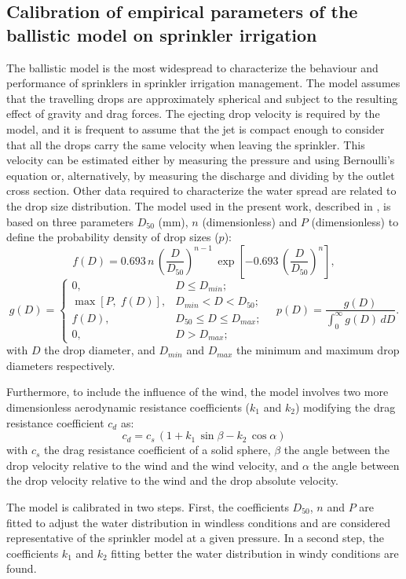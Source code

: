 \documentclass[review,authoryear]{elsarticle}
\newcommand{\EQ}[2]
{\begin{equation}#1\label{#2}\end{equation}}
\newcommand{\C}[1]{\left[#1\right]}
\newcommand{\PA}[1]{\left(#1\right)}
\begin{document}
\subsection{Calibration of empirical parameters of the ballistic model on
sprinkler irrigation}

The ballistic model \citep{Fukui80,Playan06} is the most widespread to characterize the behaviour and performance of sprinklers in sprinkler irrigation management. The model assumes that the travelling drops are approximately spherical and subject to the resulting effect of gravity and drag forces. The ejecting drop velocity is required by the model, and it is frequent to assume that the jet is compact enough to consider that all the drops carry the same velocity when leaving the sprinkler. This velocity can be estimated either by measuring the pressure and using Bernoulli's equation or, alternatively, by measuring the discharge and dividing by the outlet cross section. Other data required to characterize the water spread are related to the drop size distribution. The model used in the present work, described in \cite{Ouazaa14}, is based on three parameters $D_{50}$ (mm), $n$ (dimensionless) and $P$ (dimensionless) to define the probability density of drop sizes ($p$):
\[
	f(D)=0.693\,n\,\PA{\frac{D}{D_{50}}}^{n-1}
	\,\exp\C{-0.693\,\PA{\frac{D}{D_{50}}}^n},
\]
\EQ
{
	g(D)=\left\{\begin{array}{lc}0,&D\leq D_{min};\\
	\max[P,\;f(D)],&D_{min}<D<D_{50};\\f(D),&D_{50}\leq D\leq D_{max};\\
	0,&D>D_{max};\end{array}\right.\quad
	p(D)=\frac{g(D)}{\int_0^\infty g(D)\,dD}.
}{EqSprinklerDropSizes}
with $D$ the drop diameter, and $D_{min}$ and $D_{max}$ the minimum and maximum
drop diameters respectively.

Furthermore, to include the influence of the wind, the model involves two more dimensionless aerodynamic resistance coefficients ($k_1$ and $k_2$) modifying the drag resistance coefficient $c_d$ as:
\EQ{c_d=c_s\,\PA{1+k_1\,\sin\beta-k_2\,\cos\alpha}}{EqSprinklerDrag}
with $c_s$ the drag resistance coefficient of a solid sphere, $\beta$ the angle
between the drop velocity relative to the wind and the wind velocity, and
$\alpha$ the angle between the drop velocity relative to the wind and the drop
absolute velocity.

The model is calibrated in two steps. First, the coefficients $D_{50}$, $n$ and $P$ are fitted to adjust the water distribution in windless conditions and are considered representative of the sprinkler model at a given pressure. In a second step, the coefficients $k_1$ and $k_2$ fitting better the water distribution in windy conditions are found.
\end{document}
